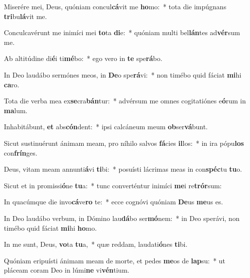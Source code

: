 \item Miserére mei, Deus, quóniam concul\textbf{cá}vit me \textbf{ho}mo:~* tota die impúgnans \textbf{tri}bu\textbf{lá}vit me.
\item Conculcavérunt me inimíci mei \textbf{to}ta \textbf{di}e:~* quóniam multi bel\textbf{lán}tes ad\textbf{vér}sum me.
\item Ab altitúdine di\textbf{é}i ti\textbf{mé}bo:~* ego vero in \textbf{te} spe\textbf{rá}bo.
\item In Deo laudábo sermónes meos, in \textbf{De}o spe\textbf{rá}vi:~* non timébo quid fáciat \textbf{mi}hi \textbf{ca}ro.
\item Tota die verba mea ex\textbf{se}cra\textbf{bán}tur:~* advérsum me omnes cogitatiónes e\textbf{ó}rum in \textbf{ma}lum.
\item Inhabitábunt, \textbf{et} abs\textbf{cón}dent:~* ipsi calcáneum meum \textbf{ob}ser\textbf{vá}bunt.
\item Sicut sustinuérunt ánimam meam, pro níhilo salvos \textbf{fá}cies \textbf{il}los:~* in ira pópu\textbf{los} con\textbf{frín}ges.
\item Deus, vitam meam annunti\textbf{á}vi \textbf{ti}bi:~* posuísti lácrimas meas in con\textbf{spéc}tu \textbf{tu}o.
\item Sicut et in promissi\textbf{ó}ne \textbf{tu}a:~* tunc converténtur inimíci \textbf{me}i re\textbf{trór}sum:
\item In quacúmque die invo\textbf{cá}ve\textbf{ro} te:~* ecce cognóvi quóniam \textbf{De}us \textbf{me}us es.
\item In Deo laudábo verbum, in Dómino lau\textbf{dá}bo ser\textbf{mó}nem:~* in Deo sperávi, non timébo quid fáciat \textbf{mi}hi \textbf{ho}mo.
\item In me sunt, Deus, \textbf{vo}ta \textbf{tu}a,~* quæ reddam, laudati\textbf{ó}nes \textbf{ti}bi.
\item Quóniam eripuísti ánimam meam de morte, et pedes \textbf{me}os de \textbf{lap}su:~* ut pláceam coram Deo in lúmi\textbf{ne} vi\textbf{vén}tium.
